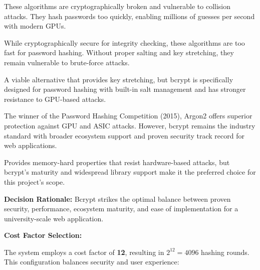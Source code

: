 \documentclass[12pt,a4paper]{article}
\begin{document}
\begin{description}[leftmargin=2em, itemsep=8pt, style=nextline]
    \item[\textbf{MD5 and SHA-1 (Rejected):}] These algorithms are cryptographically broken and vulnerable to collision attacks. They hash passwords too quickly, enabling millions of guesses per second with modern GPUs.
    
    \item[\textbf{Plain SHA-256/SHA-512 (Insufficient):}] While cryptographically secure for integrity checking, these algorithms are too fast for password hashing. Without proper salting and key stretching, they remain vulnerable to brute-force attacks.
    
    \item[\textbf{PBKDF2 (Alternative):}] A viable alternative that provides key stretching, but bcrypt is specifically designed for password hashing with built-in salt management and has stronger resistance to GPU-based attacks.
    
    \item[\textbf{Argon2 (Future Consideration):}] The winner of the Password Hashing Competition (2015), Argon2 offers superior protection against GPU and ASIC attacks. However, bcrypt remains the industry standard with broader ecosystem support and proven security track record for web applications.
    
    \item[\textbf{Scrypt (Alternative):}] Provides memory-hard properties that resist hardware-based attacks, but bcrypt's maturity and widespread library support make it the preferred choice for this project's scope.
\end{description}

\vspace{0.5em}

\textbf{Decision Rationale:} Bcrypt strikes the optimal balance between proven security, performance, ecosystem maturity, and ease of implementation for a university-scale web application.

\newpage




\textbf{Cost Factor Selection:}

The system employs a cost factor of \textbf{12}, resulting in $2^{12} = 4096$ hashing rounds. This configuration balances security and user experience:
\end{document}
